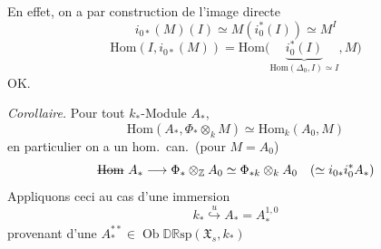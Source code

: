 \documentclass[11pt,a4paper]{article}
\begin{document}
En effet, on a par construction de l'image directe
\[
  i_{0*}(M)(I)\simeq M(i_{0}^{*}(I))\simeq M^{I}
\]
\[
  \mathrm{Hom}(I,i_{0*}(M))=\mathrm{Hom}\bigl(\underbrace{i_{0}^{*}(I)}_{\mathrm{Hom}(\Delta_{0},I)\simeq I},M\bigr)
\]
OK.

\struck{\ill{}} \emph{Corollaire.} Pour tout $k_{*}$-Module $A_{*}$,
\[
  \mathrm{Hom}(A_{*},\Phi_{*}\otimes_{k}M)\simeq\mathrm{Hom}_{k}(A_{0},M)
\]
en particulier on a un hom.\ can.\ (pour $M=A_{0}$)
\[
  \text{\struck{$\mathrm{Hom}$}}\ A_{*}\longrightarrow\Phi_{*}\otimes_{\mathbb{Z}}A_{0}
  \simeq\Phi_{*k}\otimes_{k}A_{0}\quad(\simeq i_{0*}i_{0}^{*}A_{*})
\]
Appliquons ceci au cas d'une immersion
\[
  k_{*}\overset{u}{\hookrightarrow}A_{*}=A^{1,0}_{*}
\]
provenant d'une $A^{**}_{*}\in\operatorname{Ob}\mathbb{DR}\mathrm{sp}(\mathfrak{X}_{s},k_{*})$
\end{document}
